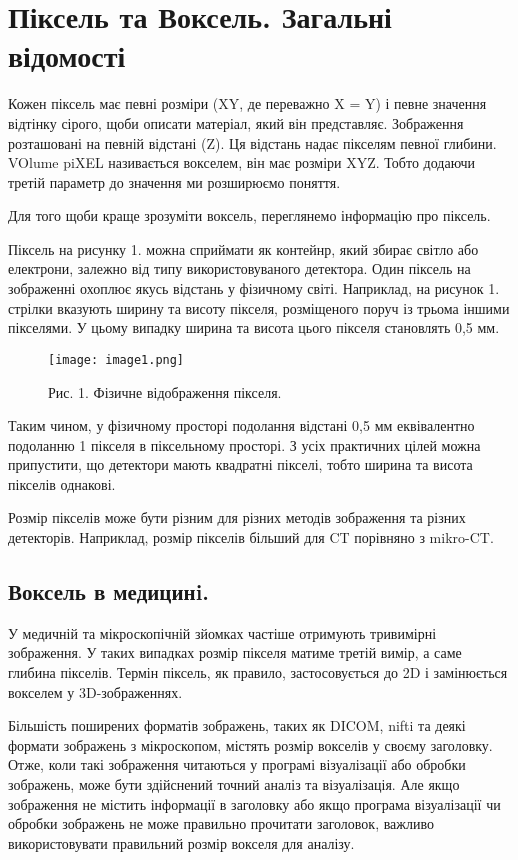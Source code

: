 \chapter{Піксель та Воксель. Загальні відомості}\label{cha:pixel_voxel}
Кожен піксель має певні розміри (XY, де переважно X = Y) і певне значення відтінку сірого, щоби описати матеріал, який він представляє.
Зображення розташовані на певній відстані (Z).
Ця відстань надає пікселям певної глибини.
VOlume piXEL називається вокселем, він має розміри XYZ.\cite{img_operators:4}
Тобто додаючи третій параметр до значення ми розширюємо поняття.

Для того щоби краще зрозуміти воксель, переглянемо інформацію про піксель.

Піксель на рисунку 1. можна сприймати як контейнр, який збирає світло або електрони, залежно від типу використовуваного детектора.
Один піксель на зображенні охоплює якусь відстань у фізичному світі.
Наприклад, на рисунок 1. стрілки вказують ширину та висоту пікселя, розміщеного поруч із трьома іншими пікселями.
У цьому випадку ширина та висота цього пікселя становлять 0,5 мм.

\begin{figure}
    \label{fig:image1}
    \centering
    \texttt{[image: image1.png]}

    Рис. 1. Фізичне відображення пікселя.
\end{figure}

Таким чином, у фізичному просторі подолання відстані 0,5 мм еквівалентно подоланню 1 пікселя в піксельному просторі.
З усіх практичних цілей можна припустити, що детектори мають квадратні пікселі, тобто ширина та висота пікселів однакові.

Розмір пікселів може бути різним для різних методів зображення та різних детекторів.
Наприклад, розмір пікселів більший для CT порівняно з mikro-CT.

\section{Воксель в медицинi.}\label{sec:voxel_med}
У медичній та мікроскопічній зйомках частіше отримують тривимірні зображення.
У таких випадках розмір пікселя матиме третій вимір, а саме глибина пікселів.
Термін піксель, як правило, застосовується до 2D і замінюється вокселем у 3D-зображеннях.

Більшість поширених форматів зображень, таких як DICOM, nifti та деякі формати зображень з мікроскопом, містять розмір вокселів у своєму заголовку.\cite{img_operators:4}
Отже, коли такі зображення читаються у програмі візуалізації або обробки зображень, може бути здійснений точний аналіз та візуалізація.
Але якщо зображення не містить інформації в заголовку або якщо програма візуалізації чи обробки зображень не може правильно прочитати заголовок, важливо використовувати правильний розмір вокселя для аналізу.
